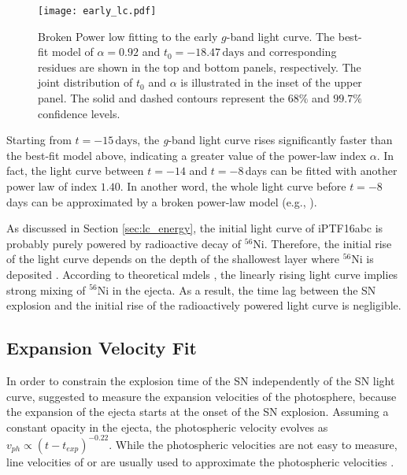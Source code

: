\documentclass[twocolumn]{aastex61}
\begin{document}
\begin{figure*}[htb]
  \centering
  \texttt{[image: early\_lc.pdf]}
  \caption{Broken Power low fitting to the early $g$-band light
    curve. The best-fit model of $\alpha=0.92$ and $t_0=-18.47\,\textrm{days}$
    and corresponding residues are shown in the top and bottom panels, respectively.
    The joint distribution of $t_0$ and $\alpha$ is illustrated in the inset of
    the upper panel. The solid and dashed contours represent the $68\%$ and $99.7\%$
    confidence levels.
  }
  \label{fig:early_lc_fit}
\end{figure*}

Starting from $t=-15\,\textrm{days}$, the \textit{g}-band light curve
rises significantly faster than the best-fit model above, indicating a
greater value of the power-law index $\alpha$. In fact, the light
curve between $t=-14$ and $t=-8$\,days can be fitted with another
power law of index $1.40$. In another word, the whole light curve
before $t=-8$\,days can be approximated by a broken power-law model
(e.g.,
\citealt{2013ApJ...778L..15Z,2014ApJ...783L..24Z,2016arXiv161202097Z,
  2016arXiv161202725Z}).

As discussed in Section \ref{sec:lc_energy}, the initial light curve
of iPTF16abc is probably purely powered by radioactive decay of
$^{56}$Ni. Therefore, the initial rise of the light curve depends on
the depth of the shallowest layer where $^{56}$Ni is deposited
\citep{2014ApJ...784...85P}. According to theoretical mdels
\citep{2016ApJ...826...96P}, the linearly rising light curve implies
strong mixing of $^{56}$Ni in the ejecta. As a result, the time lag
between the SN explosion and the initial rise of the radioactively
powered light curve is negligible.

\subsection{Expansion Velocity Fit}
\label{sec:early_vel}

In order to constrain the explosion time of the SN independently of
the SN light curve, \citet{2014ApJ...784...85P} suggested to measure
the expansion velocities of the photosphere, because the expansion of
the ejecta starts at the onset of the SN explosion. Assuming a
constant opacity in the ejecta, the photospheric velocity evolves as
$v_{ph}\propto(t-t_{exp})^{-0.22}$. While the photospheric velocities
are not easy to measure, line velocities of  or 
are usually used to approximate the photospheric velocities
\citep{2014ApJ...784...85P,2016ApJ...826..144S}.
\end{document}
